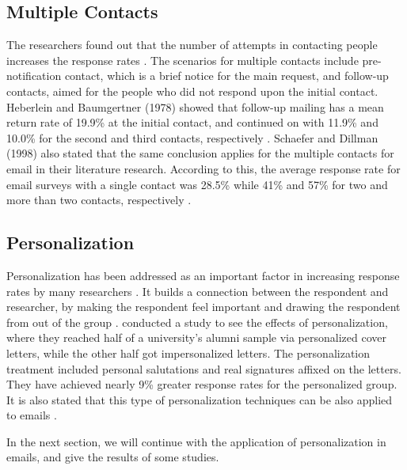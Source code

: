 \subsection{Multiple Contacts}
\label{sec:2.2.2:MultCont}
The researchers found out that the number of attempts in contacting people increases the response rates \citep{Heberlein1978,Schaefer1998}. The scenarios for multiple contacts include pre-notification contact, which is a brief notice for the main request, and follow-up contacts, aimed for the people who did not respond upon the initial contact. Heberlein and Baumgertner (1978) showed that follow-up mailing has a mean return rate of 19.9\% at the initial contact, and continued on with 11.9\% and 10.0\% for the second and third contacts, respectively \citep{Heberlein1978}. Schaefer and Dillman (1998) also stated that the same conclusion applies for the multiple contacts for email in their literature research. According to this, the average response rate for email surveys with a single contact was 28.5\% while 41\% and 57\% for two and more than two contacts, respectively \citep{Schaefer1998}.

\subsection{Personalization}
\label{sec:2.2.3:Pers}
Personalization has been addressed as an important factor in increasing response rates by many researchers \citep{Dillman1991,Schaefer1998}. It builds a connection between the respondent and researcher, by making the respondent feel important and drawing the respondent from out of the group \citep[page 272]{DillmanDonA.SmythJoleneD.Christian2009}. \cite{Dillman1974a} conducted a study to see the effects of personalization, where they reached half of a university's alumni sample via personalized cover letters, while the other half got impersonalized letters. The personalization treatment included personal salutations and real signatures affixed on the letters. They have achieved nearly 9\% greater response rates for the personalized group. It is also stated that this type of personalization techniques can be also applied to emails \citep{Schaefer1998}.
\vspace{1cm}

In the next section, we will continue with the application of personalization in emails, and give the results of some studies.

